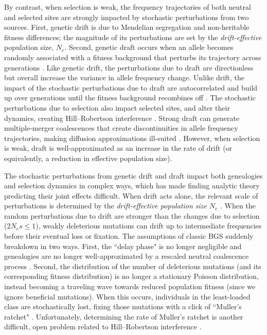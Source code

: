 \documentclass[11pt]{article}
\begin{document}
By contrast, when selection is weak, the frequency trajectories of both neutral
and selected sites are strongly impacted by stochastic perturbations from two
sources. First, genetic drift is due to Mendelian segregation and non-heritable
fitness differences; the magnitude of its perturbations are set by the
\emph{drift-effective} population size, $N_e$. Second, genetic draft occurs
when an allele becomes randomly associated with a fitness background that
perturbs its trajectory across generations \parencite{Neher2013-dz}. Like
genetic drift, the perturbations due to draft are directionless but overall
increase the variance in allele frequency change. Unlike drift, the impact of
the stochastic perturbations due to draft are autocorrelated and build up over
generations until the fitness background recombines off
\parencite{Robertson1961-ho,Santiago1995-hx,Buffalo2019-qs}. The stochastic
perturbations due to selection also impact selected sites, and alter their
dynamics, creating Hill--Robertson interference \parencite{Hill1966-kd}. Strong
draft can generate multiple-merger coalescences that create discontinuities in
allele frequency trajectories, making diffusion approximations ill-suited
\parencite{Gillespie2000-mh,Der2011-it,Neher2013-dz}. However, when selection
is weak, draft is well-approximated as an increase in the rate of drift (or
equivalently, a reduction in effective population size).

The stochastic perturbations from genetic drift and draft impact both
genealogies and selection dynamics in complex ways, which has made finding
analytic theory predicting their joint effects difficult. When drift acts
alone, the relevant scale of perturbations is determined by the
\emph{drift-effective population size} $N_e$
\parencite{Ohta1971-gq,Ohta1992-yi}. When the random perturbations due to drift
are stronger than the changes due to selection ($2N_es \le 1$), weakly
deleterious mutations can drift up to intermediate frequencies before their
eventual loss or fixation. The assumptions of classic BGS suddenly breakdown in
two ways. First, the ``delay phase" is no longer negligible and genealogies are
no longer well-approximated by a rescaled neutral coalescence process
\parencite{Przeworski1999-mb,OFallon2010-my,Higgs1995-xc}. Second, the
distribution of the number of deleterious mutations (and its corresponding
fitness distribution) is no longer a stationary Poisson distribution, instead
becoming a traveling wave \parencite{Rouzine2008-qz,Good2013-lp,Gessler1995-hz}
towards reduced population fitness (since we ignore beneficial mutations). When
this occurs, individuals in the least-loaded class are stochastically lost,
fixing those mutations with a click of ``Muller's ratchet"
\parencite{Muller1964-ki,Charlesworth1997-qn}. Unfortunately, determining the
rate of Muller's ratchet is another difficult, open problem
\parencite{Haigh1978-gt,Gordo2002-dr,Gessler1995-hz} related to Hill--Robertson
interference \parencite{Felsenstein1974-xm}.
\end{document}
